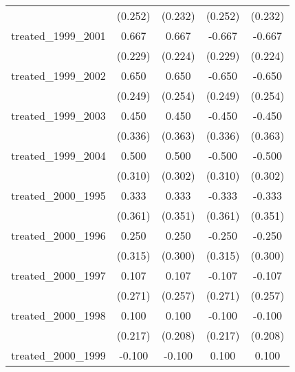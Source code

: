 {\begin{tabular}{l*{4}{c}}
            &     (0.252)         &     (0.232)         &     (0.252)         &     (0.232)         \\
[1em]
treated\_1999\_2001&       0.667\sym{**} &       0.667\sym{**} &      -0.667\sym{**} &      -0.667\sym{**} \\
            &     (0.229)         &     (0.224)         &     (0.229)         &     (0.224)         \\
[1em]
treated\_1999\_2002&       0.650\sym{**} &       0.650\sym{*}  &      -0.650\sym{**} &      -0.650\sym{*}  \\
            &     (0.249)         &     (0.254)         &     (0.249)         &     (0.254)         \\
[1em]
treated\_1999\_2003&       0.450         &       0.450         &      -0.450         &      -0.450         \\
            &     (0.336)         &     (0.363)         &     (0.336)         &     (0.363)         \\
[1em]
treated\_1999\_2004&       0.500         &       0.500         &      -0.500         &      -0.500         \\
            &     (0.310)         &     (0.302)         &     (0.310)         &     (0.302)         \\
[1em]
treated\_2000\_1995&       0.333         &       0.333         &      -0.333         &      -0.333         \\
            &     (0.361)         &     (0.351)         &     (0.361)         &     (0.351)         \\
[1em]
treated\_2000\_1996&       0.250         &       0.250         &      -0.250         &      -0.250         \\
            &     (0.315)         &     (0.300)         &     (0.315)         &     (0.300)         \\
[1em]
treated\_2000\_1997&       0.107         &       0.107         &      -0.107         &      -0.107         \\
            &     (0.271)         &     (0.257)         &     (0.271)         &     (0.257)         \\
[1em]
treated\_2000\_1998&       0.100         &       0.100         &      -0.100         &      -0.100         \\
            &     (0.217)         &     (0.208)         &     (0.217)         &     (0.208)         \\
[1em]
treated\_2000\_1999&      -0.100         &      -0.100         &       0.100         &       0.100         \\

\end{tabular}}
